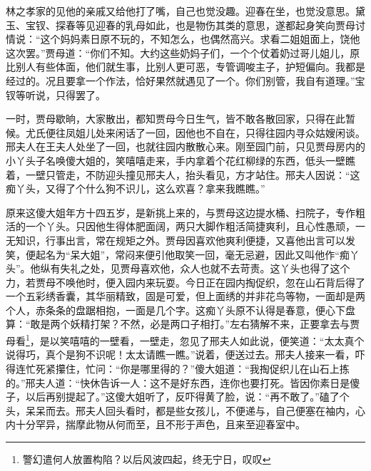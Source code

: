 \documentclass[12pt,oneside]{book}
\begin{document}
林之孝家的见他的亲戚又给他打了嘴，自己也觉没趣。迎春在坐，也觉没意思。黛玉、宝钗、探春等见迎春的乳母如此，也是物伤其类的意思，遂都起身笑向贾母讨情说：“这个妈妈素日原不玩的，不知怎么，也偶然高兴。求看二姐姐面上，饶他这次罢。”贾母道：“你们不知。大约这些奶妈子们，一个个仗着奶过哥儿姐儿，原比别人有些体面，他们就生事，比别人更可恶，专管调唆主子，护短偏向。我都是经过的。况且要拿一个作法，恰好果然就遇见了一个。你们别管，我自有道理。”宝钗等听说，只得罢了。

一时，贾母歇晌，大家散出，都知贾母今日生气，皆不敢各散回家，只得在此暂候。尤氏便往凤姐儿处来闲话了一回，因他也不自在，只得往园内寻众姑嫂闲谈。邢夫人在王夫人处坐了一回，也就往园内散散心来。刚至园门前，只见贾母房内的小丫头子名唤傻大姐的，笑嘻嘻走来，手内拿着个花红柳绿的东西，低头一壁瞧着，一壁只管走，不防迎头撞见邢夫人，抬头看见，方才站住。邢夫人因说：“这痴丫头，又得了个什么狗不识儿，这么欢喜？拿来我瞧瞧。”

原来这傻大姐年方十四五岁，是新挑上来的，与贾母这边提水桶、扫院子，专作粗活的一个丫头。只因他生得体肥面阔，两只大脚作粗活简捷爽利，且心性愚顽，一无知识，行事出言，常在规矩之外。贾母因喜欢他爽利便捷，又喜他出言可以发笑，便起名为“呆大姐”，常闷来便引他取笑一回，毫无忌避，因此又叫他作“痴丫头”。他纵有失礼之处，见贾母喜欢他，众人也就不去苛责。这丫头也得了这个力，若贾母不唤他时，便入园内来玩耍。今日正在园内掏促织，忽在山石背后得了一个五彩绣香囊，其华丽精致，固是可爱，但上面绣的并非花鸟等物，一面却是两个人，赤条条的盘踞相抱，一面是几个字。这痴丫头原不认得是春意，便心下盘算：“敢是两个妖精打架？不然，必是两口子相打。”左右猜解不来，正要拿去与贾母看\footnote{警幻遣何人放置构陷？以后风波四起，终无宁日，叹叹}，是以笑嘻嘻的一壁看，一壁走，忽见了邢夫人如此说，便笑道：“太太真个说得巧，真个是狗不识呢！太太请瞧一瞧。”说着，便送过去。邢夫人接来一看，吓得连忙死紧攥住，忙问：“你是哪里得的？”傻大姐道：“我掏促织儿在山石上拣的。”邢夫人道：“快休告诉一人：这不是好东西，连你也要打死。皆因你素日是傻子，以后再别提起了。”这傻大姐听了，反吓得黄了脸，说：“再不敢了。”磕了个头，呆呆而去。邢夫人回头看时，都是些女孩儿，不便递与，自己便塞在袖内，心内十分罕异，揣摩此物从何而至，且不形于声色，且来至迎春室中。
\end{document}
